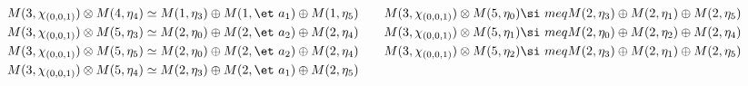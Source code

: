 \begin{align*}
M(3,\chi_{(0,0,1)}) &\otimes M(4,\eta_{4}) \simeq M(1,\eta_{3}) \oplus M(1,\et\
a_{1}) \oplus M(1,\eta_{5}) &&& M(3,\chi_{(0,0,1)}) &\otimes M(5,\eta_{0}) \si\
meq M(2,\eta_{3}) \oplus M(2,\eta_{1}) \oplus M(2,\eta_{5})\\
M(3,\chi_{(0,0,1)}) &\otimes M(5,\eta_{3}) \simeq M(2,\eta_{0}) \oplus M(2,\et\
a_{2}) \oplus M(2,\eta_{4}) &&& M(3,\chi_{(0,0,1)}) &\otimes M(5,\eta_{1}) \si\
meq M(2,\eta_{0}) \oplus M(2,\eta_{2}) \oplus M(2,\eta_{4})\\
M(3,\chi_{(0,0,1)}) &\otimes M(5,\eta_{5}) \simeq M(2,\eta_{0}) \oplus M(2,\et\
a_{2}) \oplus M(2,\eta_{4}) &&& M(3,\chi_{(0,0,1)}) &\otimes M(5,\eta_{2}) \si\
meq M(2,\eta_{3}) \oplus M(2,\eta_{1}) \oplus M(2,\eta_{5})\\
M(3,\chi_{(0,0,1)}) &\otimes M(5,\eta_{4}) \simeq M(2,\eta_{3}) \oplus M(2,\et\
a_{1}) \oplus M(2,\eta_{5})\\
\end{align*}

